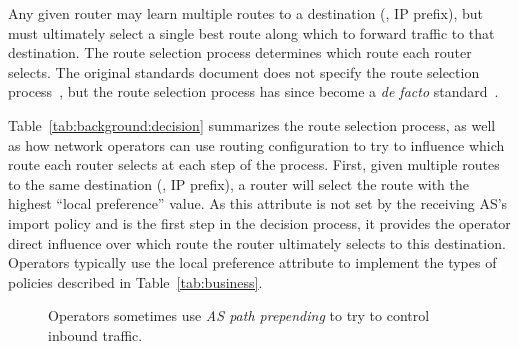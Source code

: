 Any given router may learn multiple routes to a destination (\ie, IP
prefix), but must ultimately select a single best route along which to
forward traffic to that destination.  The route selection process
determines which route each router selects.  The original standards
document does not specify the route selection process~\cite{rfc1771},
but the route selection process has since become a {\em de
facto} standard~\cite{www-cisco-bgp-path, id-bgp4}.

Table~\ref{tab:background:decision} summarizes the route selection
process, as well 
as how network operators can use routing configuration to try to
influence which route each router selects at each step of the process.
First, given multiple routes to the same destination (\ie, IP prefix), a
router will select the route with the highest ``local preference''
value.  As this attribute is not set by the receiving AS's import policy
and is the first step in the decision process, it provides the operator
direct influence over which route the router ultimately selects
to this destination.  Operators typically use the local
preference attribute to implement the types of policies described in
Table~\ref{tab:business}.  

\begin{figure}
\centering{}
\caption[The use of AS path prepending to control inbound
traffic]{Operators sometimes use {\em AS path prepending} to try to 
control inbound traffic.}
\label{fig:prepend}
\end{figure}


